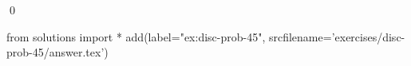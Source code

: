 
\begin{ex} 
  \label{ex:disc-prob-45}
  
  \qed
\end{ex} 
\begin{python0}
from solutions import *
add(label="ex:disc-prob-45",
    srcfilename='exercises/disc-prob-45/answer.tex') 
\end{python0}
